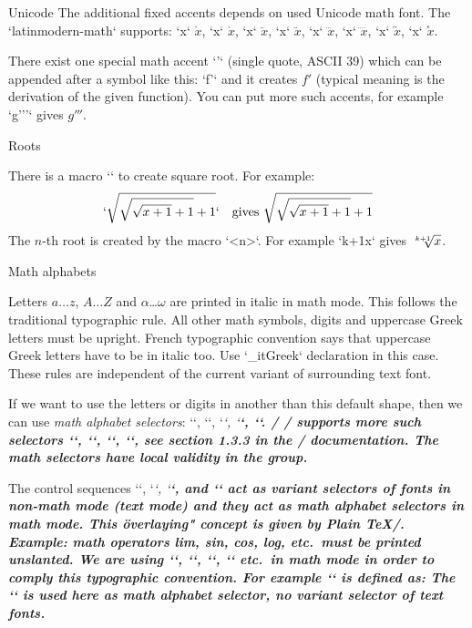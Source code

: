 \new Unicode
The additional fixed accents depends on used Unicode math font. The
`latinmodern-math` supports:
`\ovhook x` $\ovhook x$, `\ocirc x` $\ocirc x$, 
`\leftharpoonaccent x` $\leftharpoonaccent x$, `\rightharpoonaccent x` $\rightharpoonaccent x$, 
`\dddot x` $\dddot x$, `\ddddot x` $\ddddot x$, 
`\widebridgeabove x` $\widebridgeabove x$, `\asteraccent x` $\asteraccent x$. 

There exist one special math accent `'` (single quote, ASCII 39)
which can be appended after a symbol like this: `f'`
and it creates $f'$ (typical meaning is the
derivation of the given function). You can put more such accents, for
example `g'''` gives $g'''$.

\secc Roots

There is a macro `` to create square root. For example:
$$
  `\sqrt{\sqrt{\sqrt{x+1}+1}+1}` \quad \hbox{gives }
   \sqrt{\sqrt{\sqrt{x+1}+1}+1}
$$
The $n$-th root is created by the macro `\root <n>`. For
example `\root k+1\of x` gives $\root k+1\of x$.

\secc Math alphabets

Letters $a\dots z$, $A\dots Z$ and $\alpha$\dots$\omega$ are printed in italic
in math mode. This follows the traditional typographic rule.
All other math symbols, digits and uppercase Greek letters must be
upright.\fnote
{French typographic convention says that uppercase Greek letters have to be
 in italic too. Use `\_itGreek` declaration in this case.}
These rules are independent of the current variant of surrounding text font.

If we want to use the letters or digits
in another than this default shape, then we can use
{\em math alphabet selectors}: `\mit`, `\rm`, `\it`, `\bf`, `\cal`.
\new \OpTeX/
\OpTeX/ supports more such selectors `\script`, `\frak`, `\bbchar`, `\bi`, see
section 1.3.3 in the \OpTeX/ documentation. The math selectors have local
validity in the group.

The control sequences `\rm`, `\it`, `\bf`, and `\bi` act as variant selectors
of fonts in non-math mode (text mode) and they act 
as math alphabet selectors in math mode. This \"overlaying" concept 
is given by Plain \TeX/. Example: math operators lim, sin, cos,
log, etc.\ must be printed unslanted. We are using `\lim`, `\sin`, `\cos`,
`\log` etc.\ in math mode in order to comply this typographic convention. For
example `\sin` is defined as:
\begtt
\def\sin {\mathop{\rm sin}\nolimits}
\endtt
The `\rm` is used here as math alphabet selector, no variant selector of
text fonts.

